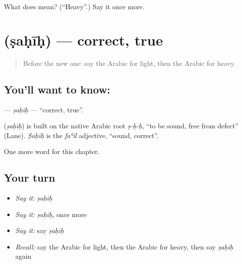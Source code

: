 \begin{tcolorbox}[breakable,colback=teal!4,colframe=teal!35!black,title={Before you move on}]
What does  mean? (\textquotedblleft{}Heavy\textquotedblright{}.) Say it once more.
\end{tcolorbox}
\section[\texorpdfstring{\ar{صحيح} (ṣaḥīḥ)}{صحيح (ṣaḥīḥ)}]{ (ṣaḥīḥ) — correct, true}

\label{lesson:AR-C85-sahih}



\begin{quote}
Before the new one: say the Arabic for light, then the Arabic for heavy.
\end{quote}

\subsection*{You'll want to know: }
\textbf{} — \emph{ṣaḥīḥ} — \textquotedblleft{}correct, true\textquotedblright{}.

\begin{cousinweb}
\textbf{} (\emph{ṣaḥīḥ}) is built on the native Arabic root \emph{ṣ-ḥ-ḥ}, \textquotedblleft{}to be sound, free from defect\textquotedblright{} (Lane). \emph{Ṣaḥīḥ} is the \emph{faʿīl} adjective, \textquotedblleft{}sound, correct\textquotedblright{}.
\end{cousinweb}

\begin{grammarlens}[title={What you've built}]
One more word for this chapter.
\end{grammarlens}

\subsection*{Your turn}
\begin{itemize}
\raggedright
  \item \emph{Say it:} \emph{ṣaḥīḥ}
  \item \emph{Say it:} \emph{ṣaḥīḥ}, once more
  \item \emph{Say it:} say \emph{ṣaḥīḥ}
  \item \emph{Recall:} say the Arabic for light, then the Arabic for heavy, then say \emph{ṣaḥīḥ} again
\end{itemize}

